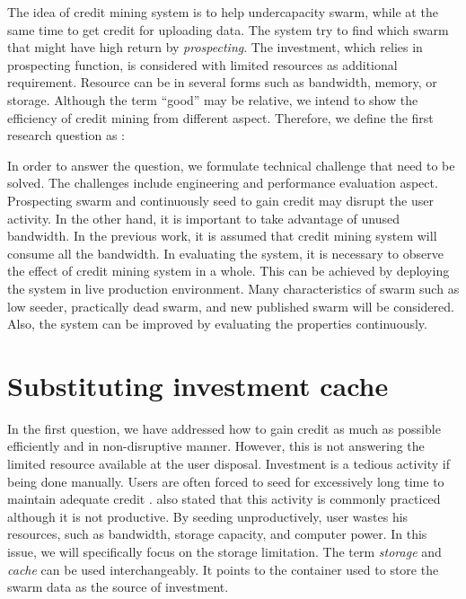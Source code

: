 The idea of credit mining system is to help undercapacity swarm, while at the same time to get credit for uploading data. The system try to find which swarm that might have high return by \textit{prospecting}. The investment, which relies in prospecting function, is considered with limited resources as additional requirement. Resource can be in several forms such as bandwidth, memory, or storage. Although the term ``good'' may be relative, we intend to show the efficiency of credit mining from different aspect. Therefore, we define the first research question as :

	
In order to answer the question, we formulate technical challenge that need to be solved. The challenges include engineering and performance evaluation aspect. Prospecting swarm and continuously seed to gain credit may disrupt the user activity. In the other hand, it is important to take advantage of unused bandwidth. In the previous work, it is assumed that credit mining system will consume all the bandwidth. In evaluating the system, it is necessary to observe the effect of credit mining system in a whole. This can be achieved by deploying the system in live production environment. Many characteristics of swarm such as low seeder, practically dead swarm, and new published swarm will be considered. Also, the system can be improved by evaluating the properties continuously.

\section{Substituting investment cache}
In the first question, we have addressed how to gain credit as much as possible efficiently and in non-disruptive manner. However, this is not answering the limited resource available at the user disposal. Investment is a tedious activity if being done manually. Users are often forced to seed for excessively long time to maintain adequate credit \cite{2013:survivepriv:jia}. \citeauthor{2013:survivepriv:jia} also stated that this activity is commonly practiced although it is not productive. By seeding unproductively, user wastes his resources, such as bandwidth, storage capacity, and computer power. In this issue, we will specifically focus on the storage limitation. The term \textit{storage} and \textit{cache} can be used interchangeably. It points to the container used to store the swarm data as the source of investment.

